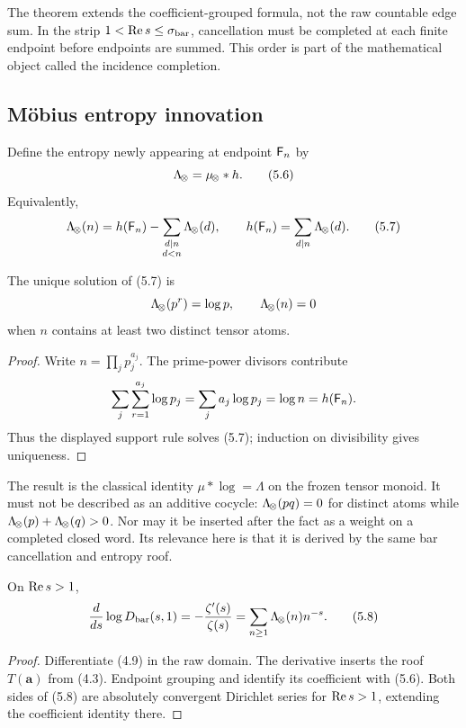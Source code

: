 The theorem extends the coefficient-grouped formula, not the raw countable
edge sum.  In the strip $1<\operatorname{Re} s\le\sigma_{\rm bar}$, cancellation must be completed at
each finite endpoint before endpoints are summed.  This order is part of the
mathematical object called the incidence completion.

\subsection{M\"obius entropy innovation}

Define the entropy newly appearing at endpoint $\mathsf F_n$ by
\[
  \Lambda_{\!\otimes}=\mu_{\!\otimes}*h.
  \tag{5.6}
\]
Equivalently,
\[
  \Lambda_{\!\otimes}(n)=h(\mathsf F_n)-
  \sum_{\substack{d\mid n\\d<n}}\Lambda_{\!\otimes}(d),
  \qquad
  h(\mathsf F_n)=\sum_{d\mid n}\Lambda_{\!\otimes}(d).
  \tag{5.7}
\]

\begin{proposition}
\label{prop:lambda}
The unique solution of (5.7) is
\[
  \Lambda_{\!\otimes}(p^r)=\log p,
  \qquad
  \Lambda_{\!\otimes}(n)=0
\]
when $n$ contains at least two distinct tensor atoms.
\end{proposition}

\begin{proof}
Write $n=\prod_jp_j^{a_j}$.  The prime-power divisors contribute
\[
  \sum_j\sum_{r=1}^{a_j}\log p_j
  =\sum_ja_j\log p_j=\log n=h(\mathsf F_n).
\]
Thus the displayed support rule solves (5.7); induction on divisibility gives
uniqueness.
\end{proof}

The result is the classical identity $\mu*\log=\Lambda$ on the frozen tensor
monoid.  It must not be described as an additive cocycle:
$\Lambda_{\!\otimes}(pq)=0$ for distinct atoms while
$\Lambda_{\!\otimes}(p)+\Lambda_{\!\otimes}(q)>0$.  Nor may it be inserted after the fact as a weight
on a completed closed word.  Its relevance here is that it is derived by the
same bar cancellation and entropy roof.

\begin{corollary}
\label{cor:derivative}
On $\operatorname{Re} s>1$,
\[
  \frac{d}{ds}\log D_{\rm bar}(s,1)
  =-\frac{\zeta'(s)}{\zeta(s)}
  =\sum_{n\ge1}\Lambda_{\!\otimes}(n)n^{-s}.
  \tag{5.8}
\]
\end{corollary}

\begin{proof}
Differentiate (4.9) in the raw domain.  The derivative inserts the roof
$T(\mathbf a)$ from (4.3).  Endpoint grouping and
 identify its coefficient with (5.6).  Both sides of (5.8)
are absolutely convergent Dirichlet series for $\operatorname{Re} s>1$, extending the
coefficient identity there.
\end{proof}

